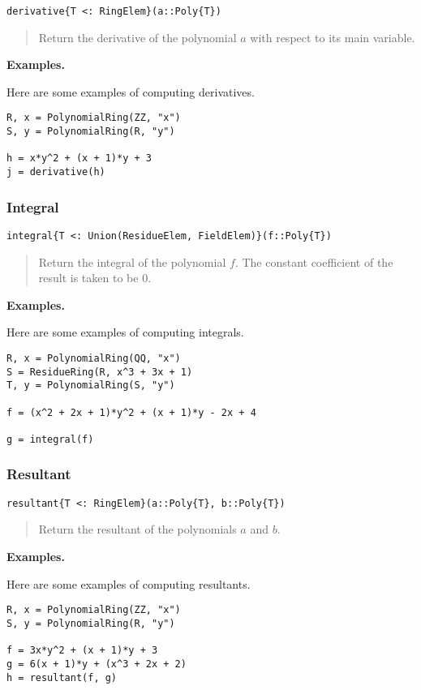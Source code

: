 \documentclass[a4paper,10pt]{article}
\newcommand{\desc}[1]{\vspace{-3mm}\begin{quote}#1\end{quote}}
\begin{document}
\begin{lstlisting}
derivative{T <: RingElem}(a::Poly{T})
\end{lstlisting}

\desc{Return the derivative of the polynomial $a$ with respect to its main
variable.}

\textbf{Examples.}

Here are some examples of computing derivatives.

\begin{lstlisting}
R, x = PolynomialRing(ZZ, "x")
S, y = PolynomialRing(R, "y")

h = x*y^2 + (x + 1)*y + 3
j = derivative(h)
\end{lstlisting}

\subsubsection{Integral}

\begin{lstlisting}
integral{T <: Union(ResidueElem, FieldElem)}(f::Poly{T})
\end{lstlisting}

\desc{Return the integral of the polynomial $f$. The constant coefficient of
the result is taken to be $0$.}

\textbf{Examples.}

Here are some examples of computing integrals.

\begin{lstlisting}
R, x = PolynomialRing(QQ, "x")
S = ResidueRing(R, x^3 + 3x + 1)
T, y = PolynomialRing(S, "y")

f = (x^2 + 2x + 1)*y^2 + (x + 1)*y - 2x + 4

g = integral(f)   
\end{lstlisting}

\subsubsection{Resultant}

\begin{lstlisting}
resultant{T <: RingElem}(a::Poly{T}, b::Poly{T})
\end{lstlisting}

\desc{Return the resultant of the polynomials $a$ and $b$.}

\textbf{Examples.}

Here are some examples of computing resultants.

\begin{lstlisting}
R, x = PolynomialRing(ZZ, "x")
S, y = PolynomialRing(R, "y")

f = 3x*y^2 + (x + 1)*y + 3
g = 6(x + 1)*y + (x^3 + 2x + 2)
h = resultant(f, g)
\end{lstlisting}
\end{document}

